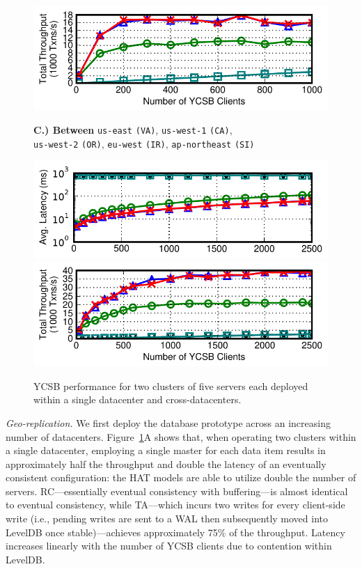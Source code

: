\begin{figure}[t!]
\includegraphics[width=\figfactor\columnwidth]{figs/finals/2wan-threads-thru.pdf}\vspace{-.75em}
\begin{center}\small \textbf{C.) Between}{ \texttt{us-east} \texttt{(VA)}, \texttt{us-west-1} \texttt{(CA)},\\ \texttt{us-west-2} \texttt{(OR)}, \texttt{eu-west} \texttt{(IR)}, \texttt{ap-northeast} \texttt{(SI)}}\end{center}\vspace{-1.5em}
\includegraphics[width=\figfactor\columnwidth]{figs/finals/5wan-threads-lats-log.pdf}\vspace{--.5em}
\includegraphics[width=\figfactor\columnwidth]{figs/finals/5wan-threads-thru.pdf}
\caption{YCSB performance for two clusters of five servers each
  deployed within a single datacenter and cross-datacenters.}
\label{fig:wan-exp}
\end{figure}

\vspace{.5em}\noindent\textit{Geo-replication.} We first deploy the
database prototype across an increasing number of
datacenters. Figure~\ref{fig:wan-exp}A shows that, when operating two
clusters within a single datacenter, employing a single master for
each data item results in approximately half the throughput and double
the latency of an eventually consistent configuration: the HAT models
are able to utilize double the number of servers. RC---essentially
eventual consistency with buffering---is almost identical to eventual
consistency, while TA---which incurs two writes for every client-side
write (i.e., pending writes are sent to a WAL then subsequently moved
into LevelDB once stable)---achieves approximately 75\% of the
throughput. Latency increases linearly with the number of YCSB clients
due to contention within LevelDB.

